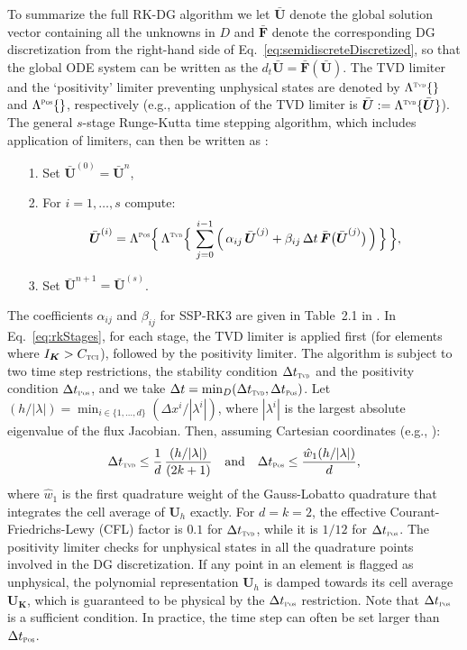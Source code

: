 \documentclass[letterpaper]{jpconf}
\newcommand{\vect}[1]{\boldsymbol{#1}}
\newcommand{\f}[2]{\frac{#1}{#2}}
\newcommand{\bK}{\vect{K}}
\newcommand{\TCI}{\textnormal{\tiny\textsc{TCI}}}
\newcommand{\Pos}{\textnormal{\tiny\textsc{Pos}}}
\newcommand{\TVD}{\textnormal{\tiny\textsc{Tvd}}}
\begin{document}
To summarize the full RK-DG algorithm we let $\bar{\vect{U}}$ denote the global solution vector containing all the unknowns in $D$ and $\bar{\vect{F}}$ denote the corresponding DG discretization from the right-hand side of Eq.~\eqref{eq:semidiscreteDiscretized}, so that the global ODE system can be written as the $d_{t}\bar{\vect{U}}=\bar{\vect{F}}(\bar{\vect{U}})$.  
The TVD limiter and the `positivity' limiter preventing unphysical states are denoted by $\Lambda^{\TVD}\{\}$ and $ \Lambda^{\Pos}\{\}$, respectively (e.g., application of the TVD limiter is $\bar{\vect{U}} := \Lambda^{\TVD}\{\bar{\vect{U}}\}$).  
The general $s$-stage Runge-Kutta time stepping algorithm, which includes application of limiters, can then be written as \cite{cockburnShu_2001}:
\begin{itemize}
  \item[1.] Set $\bar{\vect{U}}^{(0)} = \bar{\vect{U}}^{n}$,
  \item[2.] For $i=1,\ldots,s$ compute:
  \begin{equation}
    \bar{\vect{U}}^{(i)} 
    = \Lambda^{\Pos}\Big\{\,\Lambda^{\TVD}\Big\{\,\sum_{j=0}^{i-1}\Big(\,\alpha_{ij}\,\bar{\vect{U}}^{(j)}+\beta_{ij}\,\Delta t\,\bar{\vect{F}}\big(\bar{\vect{U}}^{(j)}\big)\,\Big)\,\Big\}\,\Big\},
    \label{eq:rkStages}
  \end{equation}
  \item[3.] Set $\bar{\vect{U}}^{n+1}=\bar{\vect{U}}^{(s)}$.  
\end{itemize}
The coefficients $\alpha_{ij}$ and $\beta_{ij}$ for SSP-RK3 are given in Table~2.1 in \cite{cockburnShu_2001}.  
In Eq.~\eqref{eq:rkStages}, for each stage, the TVD limiter is applied first (for elements where $I_{\bK}>C_{\TCI}$), followed by the positivity limiter.  
The algorithm is subject to two time step restrictions, the stability condition $\Delta t_{\TVD}$ and the positivity condition $\Delta t_{\Pos}$, and we take $\Delta t=\min_{D}(\Delta t_{\TVD},\Delta t_{\Pos})$.  
Let $(h/|\lambda|)=\min_{i\in\{1,\ldots,d\}}(\Delta x^{i}/|\lambda^{i}|)$, where $|\lambda^{i}|$ is the largest absolute eigenvalue of the flux Jacobian.  
Then, assuming Cartesian coordinates (e.g., \cite{cockburnShu_2001,zhangShu_2010}):
\begin{equation}
  \Delta t_{\TVD} \le \f{1}{d}\,\f{(h/|\lambda|)}{(2k+1)} \quad\text{and}\quad
  \Delta t_{\Pos} \le \f{\hat{w}_{1}(h/|\lambda|)}{d},
  \label{eq:timestepRestrictions}
\end{equation}
where $\hat{w}_{1}$ is the first quadrature weight of the Gauss-Lobatto quadrature that integrates the cell average of $\vect{U}_{h}$ exactly.  
For $d=k=2$, the effective Courant-Friedrichs-Lewy (CFL) factor is $0.1$ for $\Delta t_{\TVD}$, while it is $1/12$ for $\Delta t_{\Pos}$.  
The positivity limiter checks for unphysical states in all the quadrature points involved in the DG discretization.  
If any point in an element is flagged as unphysical, the polynomial representation $\vect{U}_{h}$ is damped towards its cell average $\vect{U}_{\bK}$, which is guaranteed to be physical by the $\Delta t_{\Pos}$ restriction.  
Note that $\Delta t_{\Pos}$ is a sufficient condition.  
In practice, the time step can often be set larger than $\Delta t_{\Pos}$.  
\end{document}
